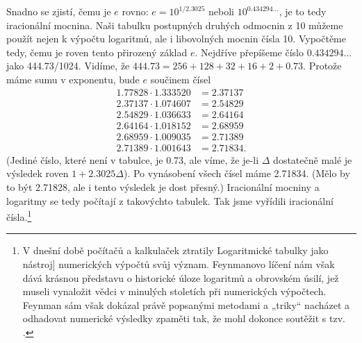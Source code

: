     Snadno se zjistí, čemu je \(e\) rovno: \(e=10^{1/\num{2.3025}}\) neboli
    \(10^{\num{0.434294}\ldots}\), je to tedy iracionální mocnina. Naši tabulku postupných druhých
    odmocnin z \num{10} můžeme použít nejen k výpočtu logaritmů, ale i libovolných mocnin čísla
    \num{10}. Vypočtěme tedy, čemu je roven tento přirozený základ \(e\). Nejdříve přepíšeme číslo
    \(\num{0.434294}\ldots\) jako \num{444.73}/\num{1024}. Vidíme, že \(\num{444.73} =\num{256} +
    \num{128} + \num{32} + \num{16} + \num{2} + \num{0.73}\). Protože máme sumu v exponentu, bude
    \(e\) součinem čísel
    \begin{align*}
      \num{1.77828}\cdot\num{1.333520} &=\num{2.37137}        \\
      \num{2.37137}\cdot\num{1.074607} &=\num{2.54829}        \\
      \num{2.54829}\cdot\num{1.036633} &=\num{2.64164}        \\
      \num{2.64164}\cdot\num{1.018152} &=\num{2.68959}        \\
      \num{2.68959}\cdot\num{1.009035} &=\num{2.71389}        \\
      \num{2.71389}\cdot\num{1.001643} &=\num{2.71834}.
    \end{align*}
      (Jediné číslo, které není v tabulce, je \num{0.73}, ale víme, že je-li \(\Delta\) dostatečně
      malé je výsledek roven \(1+\num{2.3025}\Delta\)). Po vynásobení všech čísel máme
      \num{2.71834}. (Mělo by to být \num{2.71828}, ale i tento výsledek je dost přesný.)
      Iracionální mocniny a logaritmy se tedy počítají z takovýchto tabulek.  Tak jsme vyřídili
      iracionální čísla.\footnote{V dnešní době počítačů a kalkulaček ztratily Logaritmické tabulky
      jako nástroj] numerických výpočtů svůj význam. Feynmanovo líčení nám však dává krásnou
      představu o historické úloze logaritmů a obrovském úsilí, jež museli vynaložit vědci v
      minulých stoletích při numerických výpočtech. Feynman sám však dokázal právě popsanými
      metodami a „triky“ nacházet a odhadovat numerické výsledky zpaměti tak, že mohl dokonce
      soutěžit s tzv. .}

